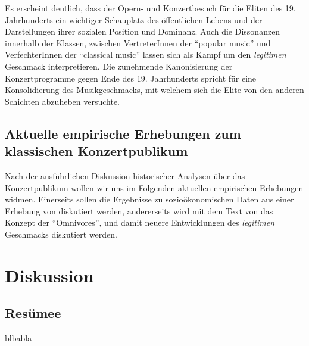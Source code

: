 \documentclass[a4paper, german, oneside]{scrbook}
\begin{document}
Es erscheint deutlich, dass der Opern- und Konzertbesuch für die Eliten des 19. Jahrhunderts ein wichtiger Schauplatz des öffentlichen Lebens und der Darstellungen ihrer sozialen Position und Dominanz. Auch die Dissonanzen innerhalb der Klassen, zwischen VertreterInnen der \enquote{popular music} und VerfechterInnen der \enquote{classical music} lassen sich als Kampf um den \emph{legitimen} Geschmack interpretieren. Die zunehmende Kanonisierung der Konzertprogramme gegen Ende des 19. Jahrhunderts spricht für eine Konsolidierung des Musikgeschmacks, mit welchem sich die Elite von den anderen Schichten abzuheben versuchte. \parencite[vgl.][127]{muller_publikum_2014}





\chapter{Aktuelle empirische Erhebungen zum klassischen Konzertpublikum}
Nach der ausführlichen Diskussion historischer Analysen über das Konzertpublikum wollen wir uns im Folgenden aktuellen empirischen Erhebungen widmen. Einerseits sollen die Ergebnisse zu sozioökonomischen Daten aus einer Erhebung von \textcite{de_la_motte-haber_konzertpublika_2007} diskutiert werden, andererseits wird mit dem Text von \textcite{gebesmair_grundzuge_2001} das Konzept der \enquote{Omnivores}, und damit neuere Entwicklungen des \emph{legitimen} Geschmacks diskutiert werden.


\part{Diskussion}



\chapter{Resümee}
blbabla



\printbibliography[filter=LV]
\printbibliography[heading=IQ, filter=IQ]
\end{document}
